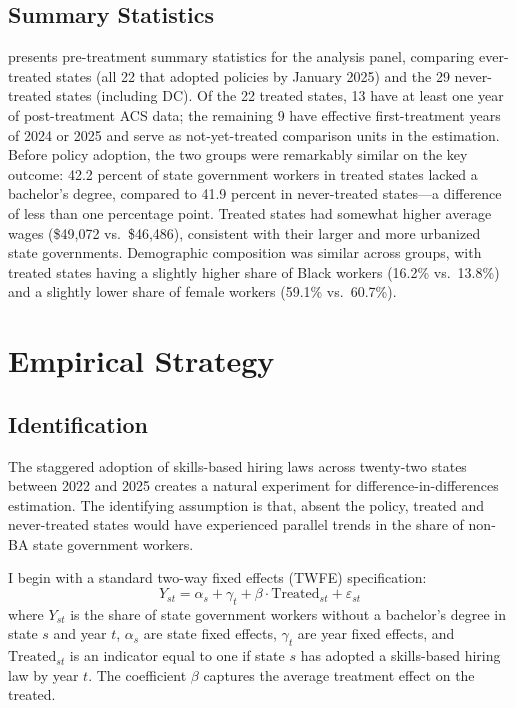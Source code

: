 \documentclass[12pt]{article}
\begin{document}
\subsection{Summary Statistics}

 presents pre-treatment summary statistics for the analysis panel, comparing ever-treated states (all 22 that adopted policies by January 2025) and the 29 never-treated states (including DC). Of the 22 treated states, 13 have at least one year of post-treatment ACS data; the remaining 9 have effective first-treatment years of 2024 or 2025 and serve as not-yet-treated comparison units in the estimation. Before policy adoption, the two groups were remarkably similar on the key outcome: 42.2 percent of state government workers in treated states lacked a bachelor's degree, compared to 41.9 percent in never-treated states---a difference of less than one percentage point. Treated states had somewhat higher average wages (\$49,072 vs.\ \$46,486), consistent with their larger and more urbanized state governments. Demographic composition was similar across groups, with treated states having a slightly higher share of Black workers (16.2\% vs.\ 13.8\%) and a slightly lower share of female workers (59.1\% vs.\ 60.7\%).




\section{Empirical Strategy} \label{sec:strategy}

\subsection{Identification}

The staggered adoption of skills-based hiring laws across twenty-two states between 2022 and 2025 creates a natural experiment for difference-in-differences estimation. The identifying assumption is that, absent the policy, treated and never-treated states would have experienced parallel trends in the share of non-BA state government workers.

I begin with a standard two-way fixed effects (TWFE) specification:
\begin{equation} \label{eq:twfe}
Y_{st} = \alpha_s + \gamma_t + \beta \cdot \text{Treated}_{st} + \varepsilon_{st}
\end{equation}
where $Y_{st}$ is the share of state government workers without a bachelor's degree in state $s$ and year $t$, $\alpha_s$ are state fixed effects, $\gamma_t$ are year fixed effects, and $\text{Treated}_{st}$ is an indicator equal to one if state $s$ has adopted a skills-based hiring law by year $t$. The coefficient $\beta$ captures the average treatment effect on the treated.
\end{document}
